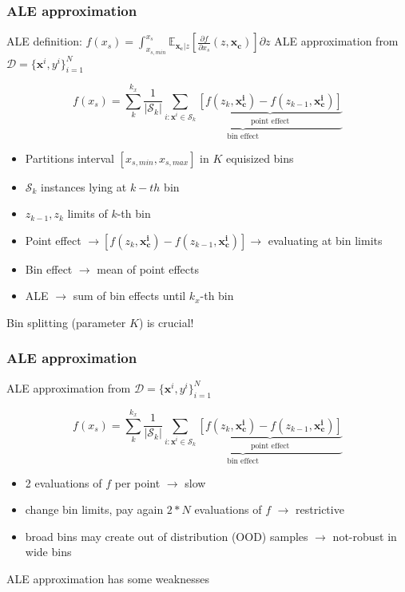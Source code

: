 \documentclass{beamer}
\newcommand{\xb}{\boldsymbol{x}}
\begin{document}
\begin{frame}
  \frametitle{ALE approximation}
  ALE definition: \( f(x_s) = \int_{x_{s, min}}^{x_s}\mathbb{E}_{\bm{x_c}|z}[ \frac{\partial f}{\partial x_s}(z, \bm{x_c})] \partial z \)
  \noindent\makebox[\linewidth]{\rule{\paperwidth}{0.4pt}}
  ALE approximation from \(\mathcal{D} = { \{\bm{x}^i, y^i}\}_{i=1}^N\)

    \[f(x_s) = \sum_k^{k_x} \underbrace{\frac{1}{|\mathcal{S}_k|} \sum_{i:\xb^i \in \mathcal{S}_k} \underbrace{[f(z_k, \bm{x^i_c}) - f(z_{k-1}, \bm{x^i_c})]}_{\text{point effect}}}_{\text{bin effect}} \]

    \begin{itemize}
    \item Partitions interval \([x_{s,min}, x_{s,max}]\) in \(K\) equisized bins
    \item \(\mathcal{S}_k\) instances lying at \(k-th\) bin
    \item \(z_{k-1}, z_k\) limits of \(k\)-th bin
    \item Point effect \(\rightarrow [f(z_k, \bm{x^i_c}) - f(z_{k-1}, \bm{x^i_c})] \rightarrow \) evaluating at bin limits
    \item Bin effect \(\rightarrow\) mean of point effects
    \item ALE \(\rightarrow\) sum of bin effects until \(k_x\)-th bin
    \end{itemize}

  \noindent\makebox[\linewidth]{\rule{\paperwidth}{0.4pt}}
  Bin splitting (parameter \(K\)) is crucial!
\end{frame}


\begin{frame}
  \frametitle{ALE approximation}
  ALE approximation from \(\mathcal{D} = { \{\bm{x}^i, y^i}\}_{i=1}^N\)

    \[f(x_s) = \sum_k^{k_x} \underbrace{\frac{1}{|\mathcal{S}_k|} \sum_{i:\xb^i \in \mathcal{S}_k} \underbrace{[f(z_k, \bm{x^i_c}) - f(z_{k-1}, \bm{x^i_c})]}_{\text{point effect}}}_{\text{bin effect}} \]

    \begin{itemize}
    \item 2 evaluations of \(f\) per point \( \rightarrow \) slow
    \item change bin limits, pay again \(2*N\) evaluations of \(f\) \( \rightarrow\) restrictive
    \item broad bins may create out of distribution (OOD) samples \( \rightarrow\) not-robust in wide bins
    \end{itemize}

  \noindent\makebox[\linewidth]{\rule{\paperwidth}{0.4pt}}
  ALE approximation has some weaknesses
\end{frame}
\end{document}
